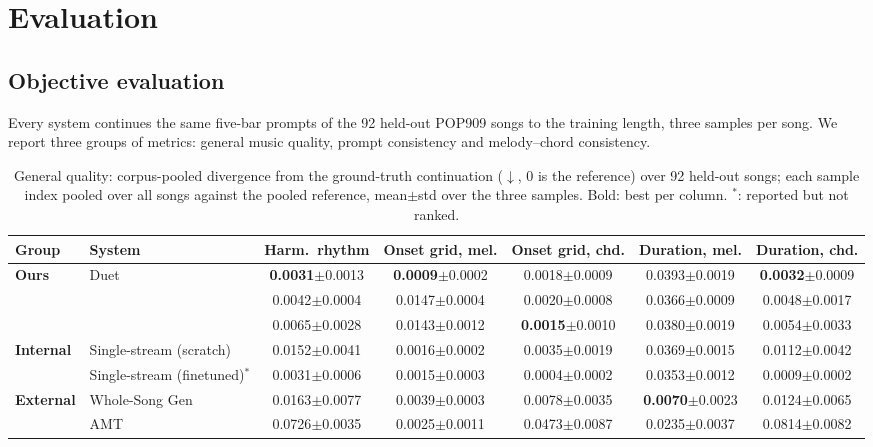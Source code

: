 \documentclass{article}
\begin{document}
\section{Evaluation}
\label{sec:eval}

\subsection{Objective evaluation}
\label{sec:objective}

Every system continues the same five-bar prompts of the 92 held-out
POP909 songs to the training length, three samples per song. We
report three groups of metrics: general music quality, prompt
consistency and melody--chord consistency.

\begin{table}[t]
\centering
\caption{General quality: corpus-pooled divergence from the ground-truth continuation ($\downarrow$, 0 is the reference) over 92 held-out songs; each sample index pooled over all songs against the pooled reference, mean$\pm$std over the three samples. Bold: best per column. $^{*}$: reported but not ranked.}
\label{tab:e1_quality}
\vspace{4pt}
\small
\begin{tabular}{llccccc}
\hline
Group & System & Harm.\ rhythm & Onset grid, mel. & Onset grid, chd. & Duration, mel. & Duration, chd. \\
\hline
\textbf{Ours} & Duet & \textbf{0.0031}$\pm$0.0013 & \textbf{0.0009}$\pm$0.0002 & 0.0018$\pm$0.0009 & 0.0393$\pm$0.0019 & \textbf{0.0032}$\pm$0.0009 \\
 & \hspace{1em}{\footnotesize w/o MoE (dense)} & 0.0042$\pm$0.0004 & 0.0147$\pm$0.0004 & 0.0020$\pm$0.0008 & 0.0366$\pm$0.0009 & 0.0048$\pm$0.0017 \\
 & \hspace{1em}{\footnotesize w/o draft tokens} & 0.0065$\pm$0.0028 & 0.0143$\pm$0.0012 & \textbf{0.0015}$\pm$0.0010 & 0.0380$\pm$0.0019 & 0.0054$\pm$0.0033 \\
\hline
\textbf{Internal} & Single-stream (scratch) & 0.0152$\pm$0.0041 & 0.0016$\pm$0.0002 & 0.0035$\pm$0.0019 & 0.0369$\pm$0.0015 & 0.0112$\pm$0.0042 \\
 & Single-stream (finetuned)$^{*}$ & 0.0031$\pm$0.0006 & 0.0015$\pm$0.0003 & 0.0004$\pm$0.0002 & 0.0353$\pm$0.0012 & 0.0009$\pm$0.0002 \\
\hline
\textbf{External} & Whole-Song Gen & 0.0163$\pm$0.0077 & 0.0039$\pm$0.0003 & 0.0078$\pm$0.0035 & \textbf{0.0070}$\pm$0.0023 & 0.0124$\pm$0.0065 \\
 & AMT & 0.0726$\pm$0.0035 & 0.0025$\pm$0.0011 & 0.0473$\pm$0.0087 & 0.0235$\pm$0.0037 & 0.0814$\pm$0.0082 \\
\hline
\end{tabular}
\end{table}
\end{document}
